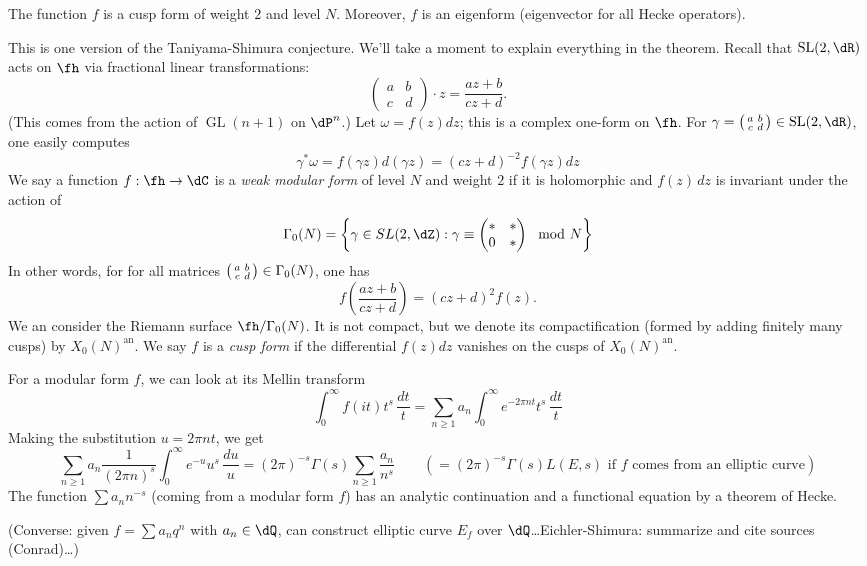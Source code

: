 \documentclass{article}
\begin{document}
\begin{theorem}
The function $f$ is a cusp form of weight $2$ and level $N$. Moreover, $f$ is 
an eigenform (eigenvector for all Hecke operators). 
\end{theorem}
This is one version of the Taniyama-Shimura conjecture. We'll take a moment to 
explain everything in the theorem. Recall that $\operatorname{SL}(2,\dR)$ acts on $\fh$ 
via fractional linear transformations:
\[
  \begin{pmatrix} a & b \\ c & d\end{pmatrix}\cdot z = \frac{a z+b}{c z+d} \text{.}
\]
(This comes from the action of $\operatorname{GL}(n+1)$ on $\dP^n$.) Let 
$\omega=f(z)dz$; this is a complex one-form on $\fh$. For 
$\gamma=\smat a b c d\in \operatorname{SL}(2,\dR)$, one easily computes 
\[
  \gamma^\ast \omega = f(\gamma z)d(\gamma z) = (c z+d)^{-2}f(\gamma z) dz 
\]
We say a function $f:\fh\to \dC$ is a \emph{weak modular form} of level $N$ and 
weight $2$ if it is holomorphic and $f(z)\, dz$ is invariant under the action of 
\[
  \Gamma_0(N) = \left\{\gamma \in SL(2,\dZ) : \gamma \equiv \begin{pmatrix} \ast & \ast \\ 0 & \ast \end{pmatrix} \mod N\right\}
\]
In other words, for for all matrices $\left(\begin{smallmatrix} a & b \\ c & d \end{smallmatrix} \right)\in\Gamma_0(N)$, one has 
\[
  f\left(\frac{a z+b}{c z+d}\right) = (c z+d)^2 f(z) \text{.}
\]
We an consider the Riemann surface $\fh/\Gamma_0(N)$. It is not compact, but we 
denote its compactification (formed by adding finitely many cusps) by 
$X_0(N)^\text{an}$. We say $f$ is a \emph{cusp form} if the differential 
$f(z) dz$ vanishes on the cusps of $X_0(N)^\text{an}$. 

For a modular form $f$, we can look at its Mellin transform 
\[
  \int_0^\infty f(i t) t^s\, \frac{dt}{t}  = \sum_{n\geqslant 1} a_n \int_0^\infty e^{-2\pi n t} t^s\, \frac{dt}{t}
\]
Making the substitution $u=2\pi n t$, we get 
\[
  \sum_{n\geqslant 1} a_n \frac{1}{(2\pi n)^s} \int_0^\infty e^{-u} u^s\, \frac{du}{u}
    = (2\pi)^{-s} \Gamma(s) \sum_{n\geqslant 1} \frac{a_n}{n^s} \qquad (= (2\pi)^{-s} \Gamma(s) L(E,s) \text{ if $f$ comes from an elliptic curve})
\]
The function $\sum a_n n^{-s}$ (coming from a modular form $f$) has an analytic 
continuation and a functional equation by a theorem of Hecke. 

(Converse: given $f=\sum a_n q^n$ with $a_n\in \dQ$, can construct elliptic curve 
$E_f$ over $\dQ$\ldots Eichler-Shimura: summarize and cite sources (Conrad)\ldots)
\end{document}
